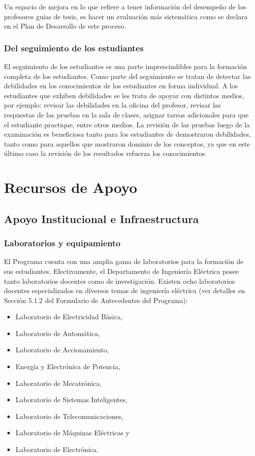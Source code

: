 Un espacio de mejora en lo que refiere a tener información del desempeño de los profesores
guías de tesis, es hacer un evaluación más sistemática como se declara en el Plan de
Desarrollo de este proceso.

\subsubsection{Del seguimiento de los estudiantes}

El seguimiento de los estudiantes es una parte imprescindibles para la formación completa de los estudiantes. Como parte 
del seguimiento se tratan de detectar las debilidades en los conocimientos de los estudiantes en forma individual. A los 
estudiantes que exhiben debilidades se les trata de apoyar con distintos medios, por ejemplo: revisar las debilidades en 
la oficina del profesor, revisar las respuestas de las pruebas en la sala de clases, asignar tareas adicionales para que 
el estudiante practique, entre otros medios. La revisión de las pruebas luego de la examinación es beneficiosa tanto para 
los estudiantes de demostraron debilidades, tanto como para aquellos que mostraron dominio de los conceptos, ya que en este 
último caso la revisión de los resultados refuerza los conocimientos.

\section{Recursos de Apoyo}

\subsection{Apoyo Institucional e Infraestructura}
\label{apoyo_inst}

\subsubsection{Laboratorios y equipamiento}

El Programa cuenta con una amplia gama de laboratorios para la formación de sus estudiantes.
Efectivamente, el Departamento de Ingeniería Eléctrica posee tanto laboratorios docentes como de
investigación. Existen ocho laboratorios docentes especializados en diversos temas de ingeniería
eléctrica (ver detalles en Sección 5.1.2 del Formulario de Antecedentes del Programa):

\begin{itemize}
\item Laboratorio de Electricidad Básica,
\item Laboratorio de Automática,
\item Laboratorio de Accionamiento,
\item Energía y Electrónica de Potencia,
\item Laboratorio de Mecatrónica,
\item Laboratorio de Sistemas Inteligentes,
\item Laboratorio de Telecomunicaciones,
\item Laboratorio de Máquinas Eléctricas y
\item Laboratorio de Electrónica.
\end{itemize}

